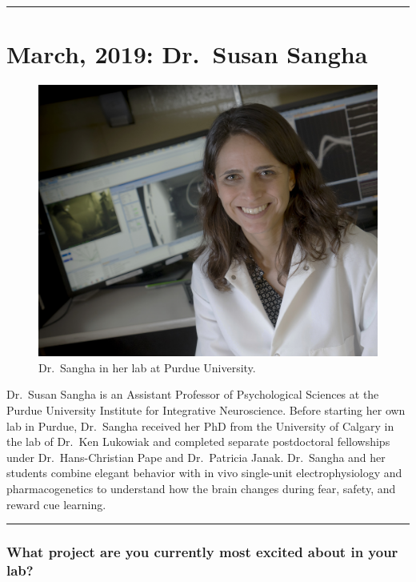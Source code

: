 \documentclass[]{article}
\title{}
\author{}
\date{}
\begin{document}
\begin{center}\rule{0.5\linewidth}{\linethickness}\end{center}

\section{March, 2019: Dr.~Susan
Sangha}\label{march-2019-dr.susan-sangha}

\begin{figure}
\centering
\includegraphics{./featured_faculty/photos/Sangha_lab.jpg}
\caption{Dr.~Sangha in her lab at Purdue University.}
\end{figure}

Dr.~Susan Sangha is an Assistant Professor of Psychological Sciences at
the Purdue University Institute for Integrative Neuroscience. Before
starting her own lab in Purdue, Dr.~Sangha received her PhD from the
University of Calgary in the lab of Dr.~Ken Lukowiak and completed
separate postdoctoral fellowships under Dr.~Hans-Christian Pape and
Dr.~Patricia Janak. Dr.~Sangha and her students combine elegant behavior
with in vivo single-unit electrophysiology and pharmacogenetics to
understand how the brain changes during fear, safety, and reward cue
learning.

\begin{center}\rule{0.5\linewidth}{\linethickness}\end{center}

\subsubsection{\texorpdfstring{\textbf{What project are you currently
most excited about in your
lab?}}{What project are you currently most excited about in your lab?}}\label{what-project-are-you-currently-most-excited-about-in-your-lab}
\end{document}
